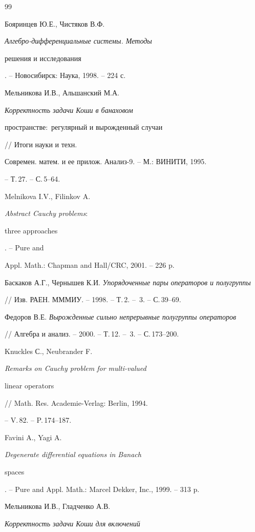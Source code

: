 \begin{thebibliography}{99} 


 




Бояринцев Ю.Е., Чистяков В.Ф. {\em Алгебро-дифференциальные системы. Методы 


решения и исследования}. -- Новосибирск: Наука, 1998. -- 224 с. 




Мельникова И.В., Альшанский М.А. {\em Корректность задачи Коши в банаховом 


пространстве$:$ регулярный и вырожденный случаи} // Итоги науки и техн. 


Современ. матем. и ее прилож. Анализ-9. -- М.: ВИНИТИ, 1995. 


-- Т.\,27. -- С.\,5--64. 




Melnikova I.V., Filinkov A. {\em Abstract Cauchy problems$:$ 


three approaches}. -- Pure and 


Appl. Math.: Chapman and Hall/CRC, 2001. -- 226 p. 




Баскаков А.Г., Чернышев К.И. {\em Упорядоченные пары операторов и полугруппы} 


// Изв. РАЕН. МММИУ. -- 1998. -- Т.\,2. -- \No\,3. -- С.\,39--69. 




Федоров В.Е. {\em Вырожденные сильно непрерывные полугруппы операторов} 


// Алгебра и анализ. -- 2000. -- Т.\,12. -- \No\,3. -- С.\,173--200. 




Knuckles С., Neubrander F. {\em Remarks on Cauchy problem for multi-valued 


linear operators} // Math. Res. Academie-Verlag: Berlin, 1994. 


-- V.\,82. -- P.\,174--187. 




Favini A., Yagi A. {\em Degenerate differential equations in Banach 


spaces}. -- Pure and Appl. Math.: Marcel Dekker, Inc., 1999. -- 313 p. 




Мельникова И.В., Гладченко А.В. {\em Корректность задачи Коши для включений 


}
\end{thebibliography}
